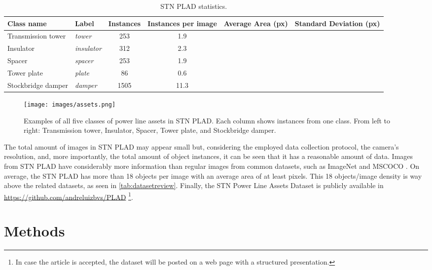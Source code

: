\documentclass[10pt,conference]{IEEEtran}
\begin{document}
\begin{table*}[htbp]
 \caption{STN PLAD statistics.}
  \centering
\begin{tabular}{llcccc}
\toprule
Class name              & Label             & Instances & Instances per image & Average Area (px)         & Standard Deviation (px)        \\
\midrule
Transmission tower & \textit{tower}     & 253       & 1.9       &  &  \\
Insulator          & \textit{insulator} & 312       & 2.3       &  &  \\
Spacer             & \textit{spacer}    & 253       & 1.9       &  &  \\
Tower plate        & \textit{plate}     & 86        & 0.6       &  &  \\
Stockbridge damper & \textit{damper}    & 1505      & 11.3      &  &  \\
    \bottomrule
  \end{tabular}
  \label{tab:objsperclass}
\end{table*}




\begin{figure*}[htp]
\captionsetup{justification=centering}
\centering
\texttt{[image: images/assets.png]}
\caption{Examples of all five classes of power line assets in STN PLAD. Each column shows instances from one class. From left to right: Transmission tower, Insulator, Spacer, Tower plate, and Stockbridge damper.}
\label{fig:assets}
\end{figure*}

The total amount of images in STN PLAD may appear small but, considering the employed data collection protocol, the camera's resolution, and, more importantly, the total amount of object instances, it can be seen that it has a reasonable amount of data. Images from STN PLAD have considerably more information than regular images from common datasets, such as ImageNet \cite{krizhevsky2012imagenet} and MSCOCO \cite{lin2014microsoft}. On average, the STN PLAD has more than 18 objects per image with an average area of at least  pixels. This 18 objects/image density is way above the related datasets, as seen in \autoref{tab:datasetreview}. Finally, the STN Power Line Assets Dataset is publicly available in \url{https://github.com/andreluizbvs/PLAD} \footnote{In case the article is accepted, the dataset will be posted on a web page with a structured presentation.}.


\section{Methods}
\label{sec:methodology}
\end{document}
